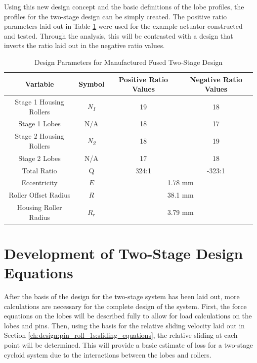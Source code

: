 Using this new design concept and the basic definitions of the lobe profiles, the profiles for the two-stage design can be simply created. The positive ratio parameters laid out in Table \ref{table:two_stage_design_params} were used for the example actuator constructed and tested. Through the analysis, this will be contrasted with a design that inverts the ratio laid out in the negative ratio values.
\begin{table}[t]
  \vskip0.2cm
  \caption{Design Parameters for Manufactured Fused Two-Stage Design}
  \label{table:two_stage_design_params}
  \begin{center}
    \vskip-0.2cm
	\begin{tabular}{|c|c|c|c|}
		\hline
		Variable & Symbol & Positive Ratio Values & Negative Ratio Values\\
		\hline
		Stage 1 Housing Rollers & \textit{N\textsubscript{1}} & 19 & 18\\
		\hline
		Stage 1 Lobes & N/A & 18 & 17\\
		\hline
		Stage 2 Housing Rollers & \textit{N\textsubscript{2}} & 18 & 19\\
		\hline
		Stage 2 Lobes & N/A & 17 & 18\\
		\hline
		Total Ratio & Q & 324:1  & -323:1 \\
		\hline
		Eccentricity & $E$ & \multicolumn{2}{c|}{1.78 mm} \\
		\hline
		Roller Offset Radius & $R$& \multicolumn{2}{c|}{38.1 mm} \\
		\hline
		Housing Roller Radius & $R_r$ & \multicolumn{2}{c|}{3.79 mm} \\
		\hline
	\end{tabular}
  \end{center}
\end{table}

\section{Development of Two-Stage Design Equations} \label{ch:dual:equations}

After the basis of the design for the two-stage system has been laid out, more calculations are necessary for the complete design of the system. First, the force equations on the lobes will be described fully to allow for load calculations on the lobes and pins. Then, using the basis for the relative sliding velocity laid out in Section \ref{ch:design:pin_roll_1s:sliding_equations}, the relative sliding at each point will be determined. This will provide a basic estimate of loss for a two-stage cycloid system due to the interactions between the lobes and rollers. 

